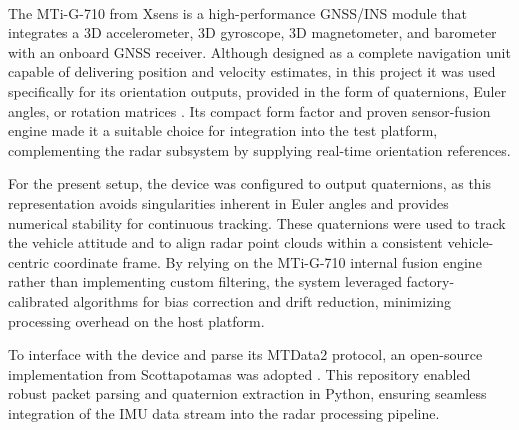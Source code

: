 \hfill
\\
The MTi-G-710 from Xsens is a high-performance GNSS/INS module that integrates a 3D accelerometer, 3D gyroscope, 3D magnetometer, and barometer with an onboard GNSS receiver.  
Although designed as a complete navigation unit capable of delivering position and velocity estimates, in this project it was used specifically for its orientation outputs, provided in the form of quaternions, Euler angles, or rotation matrices \cite{mti710_manual}.  
Its compact form factor and proven sensor-fusion engine made it a suitable choice for integration into the test platform, complementing the radar subsystem by supplying real-time orientation references.  

For the present setup, the device was configured to output quaternions, as this representation avoids singularities inherent in Euler angles and provides numerical stability for continuous tracking.  
These quaternions were used to track the vehicle attitude and to align radar point clouds within a consistent vehicle-centric coordinate frame.  
By relying on the MTi-G-710 internal fusion engine rather than implementing custom filtering, the system leveraged factory-calibrated algorithms for bias correction and drift reduction, minimizing processing overhead on the host platform.  

To interface with the device and parse its MTData2 protocol, an open-source implementation from Scottapotamas was adopted \cite{xsens_repo}.  
This repository enabled robust packet parsing and quaternion extraction in Python, ensuring seamless integration of the IMU data stream into the radar processing pipeline.  

